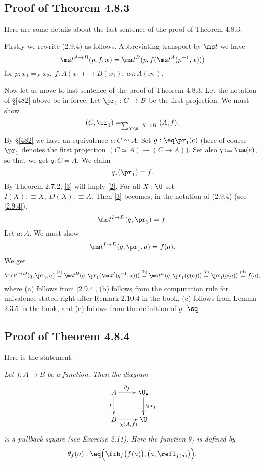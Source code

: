 \documentclass[12pt]{article}
\begin{document}

\subsection{Proof of Theorem 4.8.3}

Here are some details about the last sentence of the proof of Theorem 4.8.3:

Firstly we rewrite (2.9.4) as follows. Abbreviating transport by $\ms t$ we have 
\begin{equation}\label{2.9.4}
\ms t^{A\to B}(p,f,x)=\ms t^B(p,f(\ms t^A(p^{-1},x)))
\end{equation}
for $p:x_1=_Xx_2,\ f:A(x_1)\to B(x_1),\ a_2:A(x_2)$. 

Now let us move to last sentence of the proof of Theorem 4.8.3. Let the notation of \S\ref{482} above be in force. Let $\pr_1:C\to B$ be the first projection. We must show 
\begin{equation}\label{2}
(C,\pr_1)=_{\sum_{X:\U}\ X\to B}(A,f).
\end{equation} 
By \S\ref{482} we have an equivalence $e:C\simeq A$. Set $g:\eq\pr_1(e)$ (here of course $\pr_1$ denotes the first projection $(C\simeq A)\to(C\to A)$). Set also $q:\equiv\ua(e)$, so that we get $q:C=A$. We claim 
\begin{equation}\label{3}
q_\star(\pr_1)=f.
\end{equation} 
By Theorem 2.7.2, \eqref{3} will imply \eqref{2}. For all $X:\U$ set $I(X):\equiv X,\ D(X):\equiv A$. Then \eqref{3} becomes, in the notation of (2.9.4) (see \eqref{2.9.4}), 
$$
\ms t^{I\to D}(q,\pr_1)=f.
$$ 
Let $a:A$. We must show 
$$
\ms t^{I\to D}(q,\pr_1,a)=f(a).
$$ 
We get 
$$
\ms t^{I\to D}(q,\pr_1,a)\overset{\text{(a)}}=\ms t^D(q,\pr_1(\ms t^I(q^{-1},a)))\overset{\text{(b)}}=\ms t^D(q,\pr_1(g(a)))\overset{\text{(c)}}=\pr_1(g(a))\overset{\text{(d)}}=f(a),
$$ 
where (a) follows from \eqref{2.9.4}, (b) follows from the computation rule for univalence stated right after Remark 2.10.4 in the book, (c) follows from Lemma 2.3.5 in the book, and (c) follows from the definition of $g$. $\sq$


\subsection{Proof of Theorem 4.8.4}

Here is the statement:

\nn\emph{Let $f:A\to B$ be a function. Then the diagram
$$
\xymatrix{
A\ar[r]^-{\theta_f}\ar[d]_{f}&\U_\bullet\ar[d]^{\pr_1}\\
B\ar[r]_{\chi(A,f)} &\U}
$$ 
is a pullback square (see Exercise 2.11). Here the function $\theta_f$ is defined by}
$$
\theta_f(a):\eq\Big(\fib_f\big(f(a)\big),\big(a,\refl_{f(a)}\big)\Big).
$$
\end{document}
